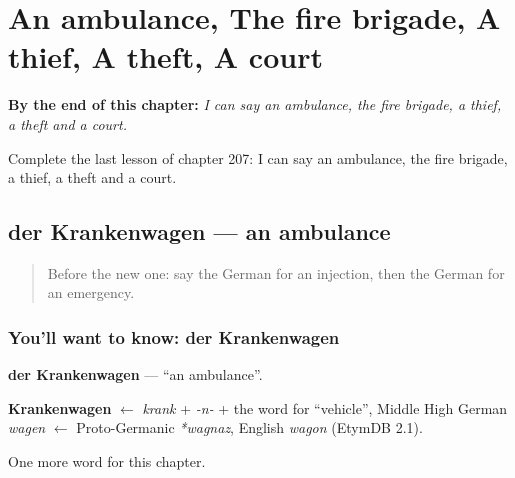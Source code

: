 
\chapter{An ambulance, The fire brigade, A thief, A theft, A court}
\label{ch:ge-an-ambulance-the-fire-brigade-a-thief-a-theft-a-court}

\begin{chapteropening}
\textbf{By the end of this chapter:} \emph{I can say an ambulance, the fire brigade, a thief, a theft and a court.}

Complete the last lesson of chapter 207: I can say an ambulance, the fire brigade, a thief, a theft and a court.
\end{chapteropening}

\section[der Krankenwagen]{der Krankenwagen — an ambulance}

\label{lesson:GE-C207-krankenwagen}



\begin{quote}
Before the new one: say the German for an injection, then the German for an emergency.
\end{quote}

\subsection*{You'll want to know: der Krankenwagen}
\textbf{der Krankenwagen} — \textquotedblleft{}an ambulance\textquotedblright{}.

\begin{cousinweb}
\textbf{Krankenwagen} $\leftarrow$ \emph{krank} + \emph{-n-} + the word for \textquotedblleft{}vehicle\textquotedblright{}, Middle High German \emph{wagen} $\leftarrow$ Proto-Germanic \emph{*wagnaz}, English \emph{wagon} (EtymDB 2.1).
\end{cousinweb}

\begin{grammarlens}[title={What you've built}]
One more word for this chapter.
\end{grammarlens}

